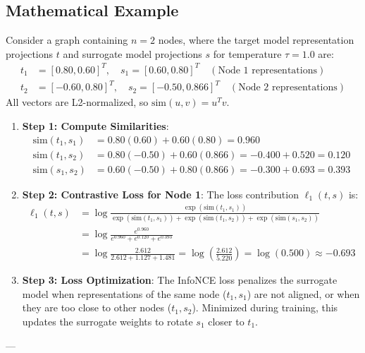 \documentclass{article}
\begin{document}
\subsection{Mathematical Example}
Consider a graph containing $n=2$ nodes, where the target model representation projections $t$ and surrogate model projections $s$ for temperature $\tau = 1.0$ are:
\begin{align*}
    t_1 &= [0.80, 0.60]^T, \quad s_1 = [0.60, 0.80]^T \quad (\text{Node 1 representations}) \\
    t_2 &= [-0.60, 0.80]^T, \quad s_2 = [-0.50, 0.866]^T \quad (\text{Node 2 representations})
\end{align*}
All vectors are L2-normalized, so $\text{sim}(u, v) = u^T v$.

\begin{enumerate}
    \item \textbf{Step 1: Compute Similarities}:
    \begin{align*}
        \text{sim}(t_1, s_1) &= 0.80(0.60) + 0.60(0.80) = 0.960 \\
        \text{sim}(t_1, s_2) &= 0.80(-0.50) + 0.60(0.866) = -0.400 + 0.520 = 0.120 \\
        \text{sim}(s_1, s_2) &= 0.60(-0.50) + 0.80(0.866) = -0.300 + 0.693 = 0.393
    \end{align*}
    
    \item \textbf{Step 2: Contrastive Loss for Node 1}: The loss contribution $\ell_1(t, s)$ is:
    \begin{align*}
        \ell_1(t, s) &= \log \frac{\exp(\text{sim}(t_1, s_1))}{\exp(\text{sim}(t_1, s_1)) + \exp(\text{sim}(t_1, s_2)) + \exp(\text{sim}(s_1, s_2))} \\
        &= \log \frac{e^{0.960}}{e^{0.960} + e^{0.120} + e^{0.393}} \\
        &= \log \frac{2.612}{2.612 + 1.127 + 1.481} = \log \left( \frac{2.612}{5.220} \right) = \log(0.500) \approx -0.693
    \end{align*}
    
    \item \textbf{Step 3: Loss Optimization}: The InfoNCE loss penalizes the surrogate model when representations of the same node ($t_1, s_1$) are not aligned, or when they are too close to other nodes ($t_1, s_2$). Minimized during training, this updates the surrogate weights to rotate $s_1$ closer to $t_1$.
\end{enumerate}

---
\end{document}
